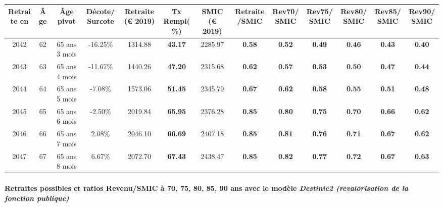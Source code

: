 { \scriptsize \begin{center} 
\begin{tabular}[htb]{|c|c||c|c||c|c||c||c|c|c|c|c|c|} 
\hline 
 Retraite en &  Âge &  Âge pivot &  Décote/Surcote &  Retraite (\euro{} 2019) &  Tx Rempl(\%) &  SMIC (\euro{} 2019) &  Retraite/SMIC &  Rev70/SMIC &  Rev75/SMIC &  Rev80/SMIC &  Rev85/SMIC &  Rev90/SMIC \\ 
\hline \hline 
 2042 &  62 &  65 ans 3 mois &  -16.25\% &  1314.88 &  {\bf 43.17} &  2285.97 &  {\bf {\color{red} 0.58}} &  {\bf {\color{red} 0.52}} &  {\bf {\color{red} 0.49}} &  {\bf {\color{red} 0.46}} &  {\bf {\color{red} 0.43}} &  {\bf {\color{red} 0.40}} \\ 
\hline 
 2043 &  63 &  65 ans 4 mois &  -11.67\% &  1440.26 &  {\bf 47.20} &  2315.68 &  {\bf {\color{red} 0.62}} &  {\bf {\color{red} 0.57}} &  {\bf {\color{red} 0.53}} &  {\bf {\color{red} 0.50}} &  {\bf {\color{red} 0.47}} &  {\bf {\color{red} 0.44}} \\ 
\hline 
 2044 &  64 &  65 ans 5 mois &  -7.08\% &  1573.06 &  {\bf 51.45} &  2345.79 &  {\bf {\color{red} 0.67}} &  {\bf {\color{red} 0.62}} &  {\bf {\color{red} 0.58}} &  {\bf {\color{red} 0.55}} &  {\bf {\color{red} 0.51}} &  {\bf {\color{red} 0.48}} \\ 
\hline 
 2045 &  65 &  65 ans 6 mois &  -2.50\% &  2019.84 &  {\bf 65.95} &  2376.28 &  {\bf {\color{red} 0.85}} &  {\bf {\color{red} 0.80}} &  {\bf {\color{red} 0.75}} &  {\bf {\color{red} 0.70}} &  {\bf {\color{red} 0.66}} &  {\bf {\color{red} 0.62}} \\ 
\hline 
 2046 &  66 &  65 ans 7 mois &  2.08\% &  2046.10 &  {\bf 66.69} &  2407.18 &  {\bf {\color{red} 0.85}} &  {\bf {\color{red} 0.81}} &  {\bf {\color{red} 0.76}} &  {\bf {\color{red} 0.71}} &  {\bf {\color{red} 0.67}} &  {\bf {\color{red} 0.62}} \\ 
\hline 
 2047 &  67 &  65 ans 8 mois &  6.67\% &  2072.70 &  {\bf 67.43} &  2438.47 &  {\bf {\color{red} 0.85}} &  {\bf {\color{red} 0.82}} &  {\bf {\color{red} 0.77}} &  {\bf {\color{red} 0.72}} &  {\bf {\color{red} 0.67}} &  {\bf {\color{red} 0.63}} \\ 
\hline 
\hline 
\end{tabular} 
\end{center} } 
\paragraph{Retraites possibles et ratios Revenu/SMIC à 70, 75, 80, 85, 90 ans avec le modèle \emph{Destinie2 (revalorisation de la fonction publique)}}  
 
